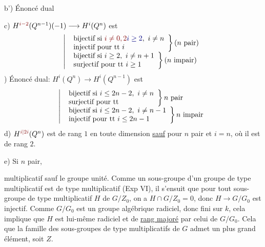 b') Énoncé dual

c) $H^{\unsure{i-2}}(Q^{n-1})(-1)\longrightarrow H^i(Q^n)$ est
\[
\left|\begin{array}{l}
\left.\begin{array}{l}
\text{bijectif si }\deleted{\unsure{i\neq0,2}}\inserted{i\geq2},\ i\neq n\\
\text{injectif pour tt }i
\end{array}\right\}(n\text{ \uline{pair}})\\[2pt]
\left.\begin{array}{l}
\text{bijectif si }i\geq2,\ i\neq n+1\\
\text{surjectif pour tt }i\geq1
\end{array}\right\}(n\text{ impair})
\end{array}\right.
\]
) Énoncé dual: $H^i(Q^n)\longrightarrow H^i(Q^{n-1})$ est
\[
\left|\begin{array}{l}
\left.\begin{array}{l}
\text{bijectif si }i\leq2n-2,\ i\neq n\\
\text{surjectif pour tt}
\end{array}\right\}n\text{ pair}\\
\left.\begin{array}{l}
\text{bijectif si }i\leq2n-2,\ i\neq n-1\\
\text{injectif pour tt }i\leq2n-1
\end{array}\right\}n\text{ impair}
\end{array}\right.
\]
d) $H^{\unsure{i|2i}}(Q^n)$  est de rang $1$ en toute dimension  \uline{sauf} pour $n$ pair et  $i=n$, où il est de rang $2$.

e) Si $n$ pair,


multiplicatif  sauf le groupe unité. Comme un sous-groupe d'un groupe de type multiplicatif est de type multiplicatif (Exp VI\quad), il s'ensuit que  pour tout sous-groupe de type multiplicatif $H$ de $G/Z_0$, on a $H\cap G/Z_0=0$, donc $H\longrightarrow G/G_0$ est injectif. Comme $G/G_0$ est un groupe algébrique radiciel, donc fini sur $k$, cela implique que $H$ est lui-même radiciel et de \uline{rang majoré} par celui de $G/G_0$. Cela  que la famille des sous-groupes de type multiplicatifs de $G$ admet un plus grand élément, soit $Z$.

